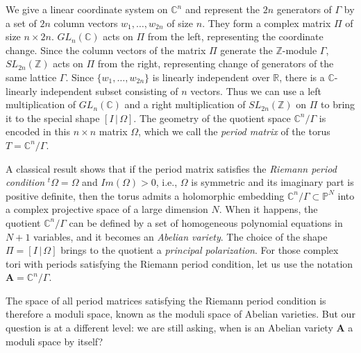 \documentclass{amsart}
\theoremstyle{definition}
\numberwithin{equation}{section}
\numberwithin{figure}{section}
\def\Gam{\Gamma}
\newcommand{\bP}{{\mathbb{P}}}
\newcommand{\bC}{{\mathbb{C}}}
\newcommand{\bR}{{\mathbb{R}}}
\newcommand{\bZ}{{\mathbb{Z}}}
\begin{document}
We give a linear coordinate system on $\bC^n$ and represent
the $2n$ generators of $\Gam$ by a set of $2n$ column vectors
$w_1,\dots, w_{2n}$ of size $n$. They form a complex matrix $\Pi$
of size $n\times 2n$. $GL_n(\bC)$ acts on $\Pi$ from the left,
representing the coordinate change. Since the column vectors of the
matrix $\Pi$ generate the $\bZ$-module $\Gam$, 
$SL_{2n}(\bZ)$ acts on $\Pi$ from the right, representing 
change of generators of the same lattice $\Gam$. 
Since $\{w_1,\dots, w_{2n}\}$ is linearly independent over $\bR$, 
there is a $\bC$-linearly independent subset consisting of
$n$ vectors. Thus we can use a left multiplication of $GL_n(\bC)$ and 
a right multiplication of $SL_{2n}(\bZ)$ on $\Pi$ to bring
it to the special shape  $[I\,|\,\Omega]$. The geometry of the 
quotient space $\bC^n/\Gam$ is encoded in this $n\times n$ matrix
$\Omega$, which we call the \emph{period matrix} of the
torus $T=\bC^n/\Gam$.

A classical result shows that if the period matrix satisfies the
\emph{Riemann period condition} $^t \Omega = \Omega$ and 
$Im(\Omega)>0$, i.e., $\Omega$ is symmetric and its imaginary part is
positive definite, then the torus admits a holomorphic embedding
$\bC^n/\Gam \subset \bP^N$ into a complex projective space
of a large dimension $N$. When it happens,  the quotient
$\bC^n/\Gam$ can be defined by a set of homogeneous polynomial equations 
in $N+1$ variables,  and it becomes an \emph{Abelian variety}.
The choice of the shape $\Pi=[I\,|\,\Omega]$ brings to 
the quotient a \emph{principal
polarization}. For those complex tori with periods satisfying the Riemann
period condition, let us use the notation $\mathbf{A} = \bC^n/\Gam$.

The space of all period matrices satisfying the Riemann period condition
is therefore a moduli space, known as the moduli space of Abelian varieties. 
But our question is at a different level: we are still asking, when is an Abelian 
variety $\mathbf{A}$ a moduli space by itself?
\end{document}
